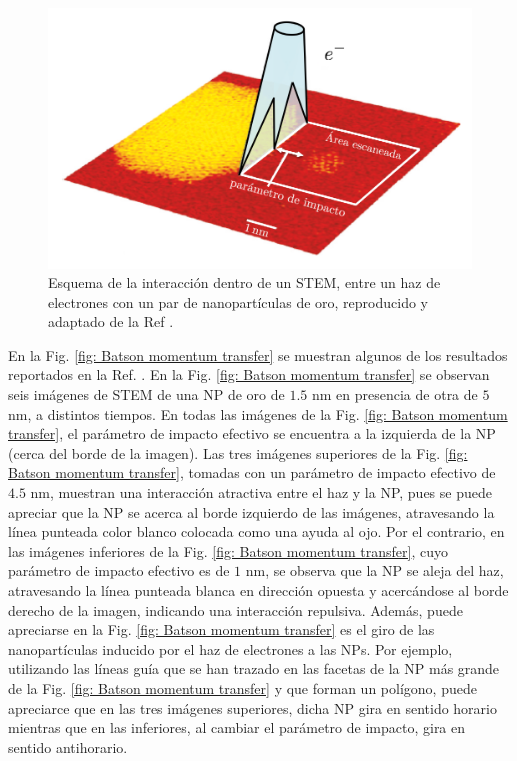 \begin{figure}[h!]
\centering
\includegraphics[width=0.6\linewidth]{17-imagenes/1-Intro/STEM}
\caption{\label{fig: Batson STEM} Esquema de la interacción dentro de un STEM, entre un haz de electrones con un par de nanopartículas de oro, reproducido y adaptado de la Ref \cite{Batson}.} 
\end{figure}

En la Fig. \ref{fig: Batson momentum transfer} se muestran algunos de los resultados reportados en la Ref. \cite{Batson}. En la Fig. \ref{fig: Batson momentum transfer} se observan seis imágenes de STEM de una NP de oro de $1.5$ nm en presencia de otra de $5$ nm, a distintos tiempos. En todas las imágenes de la Fig. \ref{fig: Batson momentum transfer}, el parámetro de impacto efectivo se encuentra a la izquierda de la NP (cerca del borde de la imagen). Las tres imágenes superiores de la Fig. \ref{fig: Batson momentum transfer}, tomadas con un parámetro de impacto efectivo de $4.5$ nm, muestran una interacción atractiva entre el haz y la NP, pues se puede apreciar que la NP se acerca al borde izquierdo de las imágenes, atravesando la línea punteada color blanco colocada como una ayuda al ojo. Por el contrario, en las imágenes inferiores de la Fig. \ref{fig: Batson momentum transfer}, cuyo  parámetro de impacto efectivo es de $1$ nm,  se observa que la NP se aleja del haz, atravesando la línea punteada blanca en dirección opuesta y acercándose al borde derecho de la imagen, indicando una interacción repulsiva. Además, puede apreciarse en la Fig. \ref{fig: Batson momentum transfer} es el giro de las nanopartículas inducido por el haz de electrones a las NPs. Por ejemplo, utilizando las líneas guía que se han trazado en las facetas de la NP más grande de la Fig. \ref{fig: Batson momentum transfer} y que forman un polígono, puede apreciarce que en las tres imágenes superiores, dicha NP gira en sentido horario mientras que en las inferiores, al cambiar el parámetro de impacto, gira en sentido antihorario.

